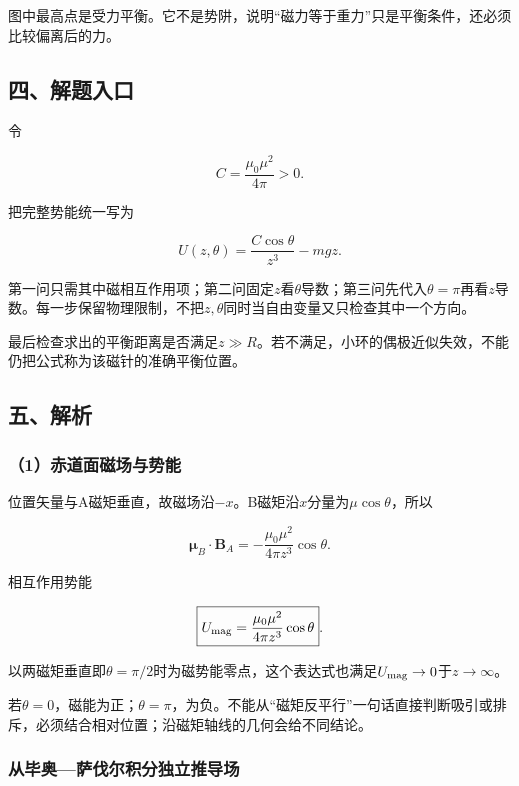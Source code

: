 \documentclass[12pt,a4paper,fontset=fandol]{ctexart}
\begin{document}
图中最高点是受力平衡。它不是势阱，说明``磁力等于重力''只是平衡条件，还必须比较偏离后的力。

\subsection{四、解题入口}\label{ux56dbux89e3ux9898ux5165ux53e3-3}

令

\[
C=\frac{\mu_0\mu^2}{4\pi}>0.
\]

把完整势能统一写为

\[
U(z,\theta)=\frac{C\cos\theta}{z^3}-mgz.
\]

第一问只需其中磁相互作用项；第二问固定\(z\)看\(\theta\)导数；第三问先代入\(\theta=\pi\)再看\(z\)导数。每一步保留物理限制，不把\(z,\theta\)同时当自由变量又只检查其中一个方向。

最后检查求出的平衡距离是否满足\(z\gg R\)。若不满足，小环的偶极近似失效，不能仍把公式称为该磁针的准确平衡位置。

\subsection{五、解析}\label{ux4e94ux89e3ux6790-3}

\subsubsection{（1）赤道面磁场与势能}\label{ux8d64ux9053ux9762ux78c1ux573aux4e0eux52bfux80fd}

位置矢量与A磁矩垂直，故磁场沿\(-x\)。B磁矩沿\(x\)分量为\(\mu\cos\theta\)，所以

\[
\boldsymbol\mu_B\cdot\boldsymbol B_A
=-\frac{\mu_0\mu^2}{4\pi z^3}\cos\theta.
\]

相互作用势能

\[
\boxed{U_{\rm mag}=\frac{\mu_0\mu^2}{4\pi z^3}\cos\theta}.
\]

以两磁矩垂直即\(\theta=\pi/2\)时为磁势能零点，这个表达式也满足\(U_{\rm mag}\to0\)于\(z\to\infty\)。

若\(\theta=0\)，磁能为正；\(\theta=\pi\)，为负。不能从``磁矩反平行''一句话直接判断吸引或排斥，必须结合相对位置；沿磁矩轴线的几何会给不同结论。

\subsubsection{从毕奥---萨伐尔积分独立推导场}\label{ux4eceux6bd5ux5965ux8428ux4f10ux5c14ux79efux5206ux72ecux7acbux63a8ux5bfcux573a}
\end{document}
